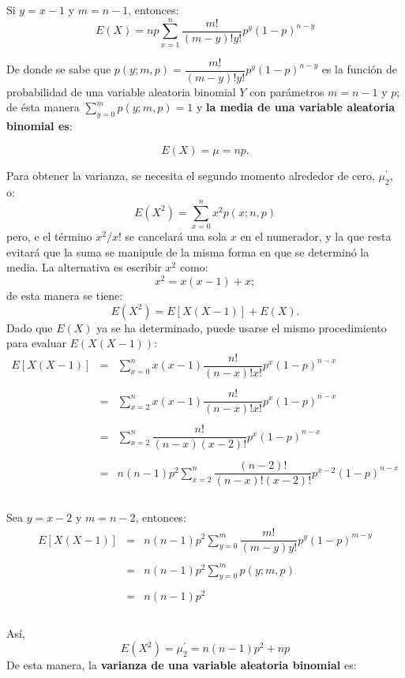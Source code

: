 Si $y=x-1$ y $m=n-1$, entonces:
$$E(X)=np\sum_{x=1}^n \dfrac{m!}{(m-y)!y!}p^{y}(1-p)^{n-y}$$

De donde se sabe que $p(y; m,p) = \dfrac{m!}{(m-y)!y!}p^{y}(1-p)^{n-y}$   es la función de probabilidad de una variable aleatoria binomial $Y$ con parámetros $m=n-1$ y $p$; de ésta manera $\sum_{y=0}^m p(y;m,p) = 1$ y \textbf{la media de una variable  aleatoria binomial es}:

\begin{tcolorbox}[colback=white]
    $$E(X)=\mu = np.$$
\end{tcolorbox}

Para obtener la varianza, se necesita el segundo momento alrededor de cero, $\mu_2^{'}$, o:
$$E(X^2) = \sum\limits_{x=0}^n x^2 p(x;n,p)$$
pero, e el término $x^2/x!$ se cancelará una sola $x$ en el numerador, y la que resta evitará que la suma se manipule de la misma forma en que se determinó la media. La alternativa es escribir $x^2$ como:
$$x^2= x(x-1)+x;$$
de esta manera se tiene:
$$E(X^2) = E[X(X-1)]+E(X).$$
Dado que $E(X)$ ya se ha determinado, puede usarse el mismo procedimiento para evaluar $E(X(X-1))$:
$$\begin{array}{rcl}
    E[X(X-1)]&=&\sum\limits_{x=0}^n x(x-1)\dfrac{n!}{(n-x)!x!}p^x (1-p)^{n-x}\\\\
	     &=&\sum\limits_{x=2}^n x(x-1)\dfrac{n!}{(n-x)!x!}p^x(1-p)^{n-x}\\\\
	     &=&\sum\limits_{x=2}^n \dfrac{n!}{(n-x)(x-2)!}p^x(1-p)^{n-x}\\\\
	     &=&n(n-1)p^2\sum\limits_{x=2}^n \dfrac{(n-2)!}{(n-x)!(x-2)!}p^{x-2}(1-p)^{n-x}\\\\
\end{array}$$

Sea $y=x-2$ y $m=n-2$, entonces:
$$\begin{array}{rcl}
    E[X(X-1)]&=&n(n-1)p^2\sum\limits_{y=0}^m \dfrac{m!}{(m-y)y!}p^y(1-p)^{m-y}\\\\
	     &=&n(n-1)p^2\sum\limits_{y=0}^m p(y;m,p)\\\\
	     &=&n(n-1)p^2\\\\
\end{array}$$

Así,
$$E(X^2) = \mu_2^{'} = n(n-1)p^2+np$$
De esta manera, la \textbf{varianza de una variable aleatoria binomial} es:

